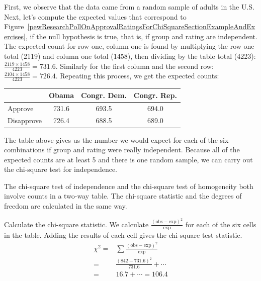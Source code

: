 \begin{examplewrap}
\begin{nexample}{First, we observe that the data came from a random sample of adults in the U.S.  Next, let's compute the expected values that correspond to Figure~\ref{pewResearchPollOnApprovalRatingsForChiSquareSectionExampleAndExercises}, if the null hypothesis is true, that is, if group and rating are independent.  }
The expected count for row one, column one is found by multiplying the row one total (2119) and column one total (1458), then dividing by the table total (4223): $\frac{2119\times 1458}{4223} = 731.6$. Similarly for the first column and the second row: $\frac{2104\times 1458}{4223} = 726.4$. Repeating this process, we get the expected counts:  
\begin{center}
\begin{tabular}{l ccc}
&Obama  &Congr. Dem. & Congr. Rep. \\
\hline
Approve				    & 731.6    & 693.5 & 694.0   \\
Disapprove			    & 726.4    & 688.5 & 689.0  \\
\hline
\end{tabular}
\end{center}

\end{nexample}
\end{examplewrap}


The table above gives us the number we would expect for each of the six combinations if group and rating were really independent.  Because all of the expected counts are at least 5 and there is one random sample, we can carry out the chi-square test for independence.  



The chi-square test of independence and the chi-square test of homogeneity both involve counts in a two-way table.  The chi-square statistic and the degrees of freedom are calculated in the same way.  

\begin{examplewrap}
\begin{nexample}{Calculate the chi-square statistic.}
We calculate $\frac{(\text{obs} - \text{exp})^2}{\text{exp}}$ for each of the six cells in the table. Adding the results of each cell gives the chi-square test statistic.
\begin{align*}
\chi^2 =& \sum{\frac{(\text{obs} - \text{exp})^2}{\text{exp}}}\\
=& \frac{(842-731.6)^2}{731.6} +\cdots \\
=& 16.7 + \cdots  = 106.4
\end{align*}
\end{nexample}
\end{examplewrap}

